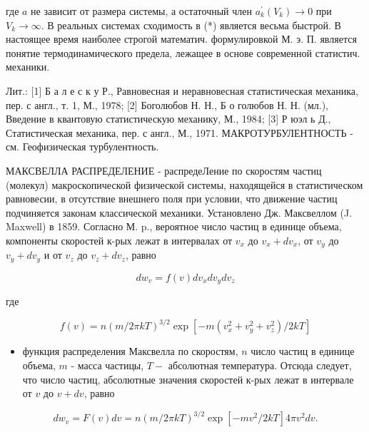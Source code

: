 \documentclass[10pt]{article}
\begin{document}
где $a$ не зависит от размера системы, а остаточный член $a_{k}^{\prime}\left(V_{k}\right) \rightarrow 0$ при $V_{k} \rightarrow \infty$. В реальных системах сходимость в (*) является весьма быстрой. В настоящее время наиболее строгой математич. формулировкой М. э. П. является понятие термодинамического предела, лежащее в основе современной статистич. механики.



Лит.: [1] Б а л е с к у Р., Равновесная и неравновесная статистическая механика, пер. с англ., т. 1, М., 1978; [2] Боголюбов Н. Н., Б о голюбов Н. Н. (мл.), Введение в квантовую статистическую механику, М., 1984; [3] Р юэл ь Д., Статистическая механика, пер. с англ., М., 1971. МАКРОТУРБУЛЕНТНОСТЬ - см. Геофизическая турбулентность.



МАКСВЕЛЛА РАСПРЕДЕЛЕНИЕ - распредеЛение по скоростям частиц (молекул) макроскопической физической системы, находящейся в статистическом равновесии, в отсутствие внешнего поля при условии, что движение частиц подчиняется законам классической механики. Установлено Дж. Максвеллом (J. Maxwell) в 1859. Согласно М. p., вероятное число частиц в единице объема, компоненты скоростей к-рых лежат в интервалах от $v_{x}$ до $v_{x}+d v_{x}$, от $v_{y}$ до $v_{y}+d v_{y}$ и от $v_{z}$ до $v_{z}+d v_{z}$, равно



\[

d w_{v}=f(v) d v_{x} d v_{y} d v_{z}

\]



где



\[

f(v)=n(m / 2 \pi k T)^{3 / 2} \exp \left[-m\left(v_{x}^{2}+v_{y}^{2}+v_{z}^{2}\right) / 2 k T\right]

\]



\begin{itemize}

  \item функция распределения Максвелла по скоростям, $n$ число частиц в единице объема, $m$ - масса частицы, $T-$ абсолютная температура. Отсюда следует, что число частиц, абсолютные значения скоростей к-рых лежат в интервале от $v$ до $v+d v$, равно

\end{itemize}



\[

d w_{v}=F(v) d v=n(m / 2 \pi k T)^{3 / 2} \exp \left[-m v^{2} / 2 k T\right] 4 \pi v^{2} d v .

\]
\end{document}
